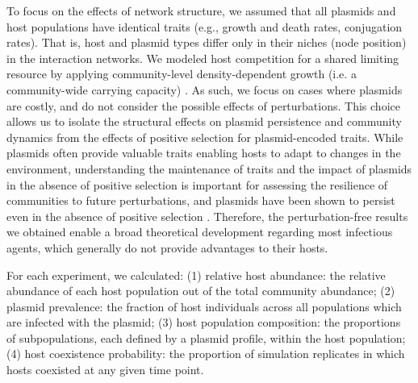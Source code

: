 \documentclass[10pt,letterpaper]{article}
\begin{document}
To focus on the effects of network structure, we assumed that all plasmids and host populations have identical traits (e.g., growth and death rates, conjugation rates). That is, host and plasmid types differ only in their niches (node position) in the interaction networks. We modeled host competition for a shared limiting resource by applying community-level density-dependent growth (i.e. a community-wide carrying capacity) \cite{Haegeman2008-fn}. As such, we focus on cases where plasmids are costly, and do not consider the possible effects of perturbations. This choice allows us to isolate the structural effects on plasmid persistence and community dynamics from the effects of positive selection for plasmid-encoded traits. While plasmids often provide valuable traits enabling hosts to adapt to changes in the environment, understanding the maintenance of traits and the impact of plasmids in the absence of positive selection is important for assessing the resilience of communities to future perturbations, and plasmids have been shown to persist even in the absence of positive selection \cite{San_Millan2014-ak, Hall2016-zb, Lopatkin2017-pu}. Therefore, the perturbation-free results we obtained enable a broad theoretical development regarding most infectious agents, which generally do not provide advantages to their hosts.

For each experiment, we calculated: (1) relative host abundance: the relative abundance of each host population out of the total community abundance; (2) plasmid prevalence: the fraction of host individuals across all populations which are infected with the plasmid; (3) host population composition: the proportions of subpopulations, each defined by a plasmid profile, within the host population; (4) host coexistence probability: the proportion of simulation replicates in which hosts coexisted at any given time point.
\end{document}
